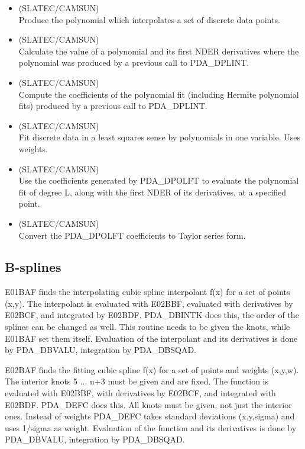 \documentclass[11pt,twoside,nolof]{starlink}
\begin{document}
\begin{itemize}
\item {} (SLATEC/CAMSUN)\ \\
   Produce the polynomial which interpolates a set of discrete data
   points.
\item {} (SLATEC/CAMSUN)\ \\
   Calculate the value of a polynomial and its first NDER derivatives
   where the polynomial was produced by a previous call to PDA\_DPLINT.
\item {} (SLATEC/CAMSUN)\ \\
   Compute the coefficients of the polynomial fit (including Hermite
   polynomial fits) produced by a previous call to PDA\_DPLINT.

\item {} (SLATEC/CAMSUN)\ \\
   Fit discrete data in a least squares sense by polynomials in one
   variable. Uses weights.
\item {} (SLATEC/CAMSUN)\ \\
   Use the coefficients generated by PDA\_DPOLFT to evaluate the
   polynomial fit of degree L, along with the first NDER of its
   derivatives, at a specified point.
\item {} (SLATEC/CAMSUN)\ \\
   Convert the PDA\_DPOLFT coefficients to Taylor series form.

\end{itemize}


\subsection{B-splines}

   E01BAF finds the interpolating cubic spline interpolant f(x) for a
   set of points (x,y). The interpolant is evaluated with E02BBF,
   evaluated with
   derivatives by E02BCF, and integrated by E02BDF. PDA\_DBINTK
   does this, the order of the splines can be changed as well. This
   routine needs to be given the knots, while E01BAF set them itself.
   Evaluation of the interpolant and its derivatives is done by
   PDA\_DBVALU, integration by PDA\_DBSQAD.

   E02BAF finds the fitting cubic spline f(x) for a set of points and
   weights (x,y,w). The interior knots 5 ... n+3 must be given and are
   fixed. The function is evaluated with E02BBF, with derivatives by
   E02BCF, and integrated with E02BDF. PDA\_DEFC does this. All knots must be
   given, not just the interior ones.
   Instead of weights PDA\_DEFC takes standard deviations (x,y,sigma) and uses
   1/sigma as weight. Evaluation of the function and its derivatives is
   done by PDA\_DBVALU, integration by PDA\_DBSQAD.
\end{document}

